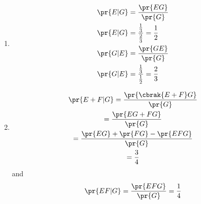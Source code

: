 \begin{enumerate}[label=\thesubsection.\arabic*.,ref=\thesubsection.\theenumi]
\begin{enumerate}
\item 	\begin{align}
	\pr{E|G} &= \frac{\pr{E G}}{\pr{G}}\\
	\pr{E|G} &= \frac{\frac{1}{3}}{\frac{2}{3}} = \frac{1}{2}\\
	\pr{G|E} &= \frac{\pr{G E}}{\pr{G}}\\
	\pr{G|E} &= \frac{\frac{1}{3}}{\frac{1}{2}} = \frac{2}{3}\\
	\end{align}
	
\item	%
\begin{multline}
\pr{E+F|G} = \frac{\pr{\cbrak{E+F}G}}{\pr{G}}
\\
 = \frac{\pr{EG + FG}}{\pr{G}}
\\
=\frac{\pr{EG} +\pr{ FG}- \pr{EFG}}{\pr{G}}
\\
 = \frac{3}{4}
\end{multline}
and 
\begin{align}
\pr{EF|G} = 
\frac{ \pr{EFG}}{\pr{G}}
 = \frac{1}{4}
\end{align}

\end{enumerate}


\end{enumerate}

